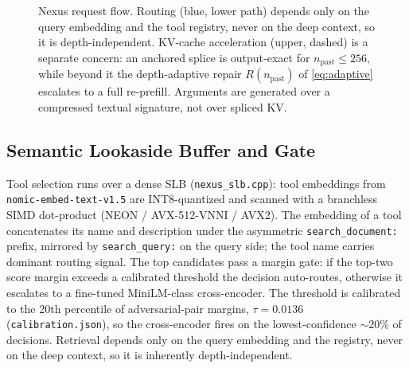 \documentclass[10pt,conference]{IEEEtran}
\newcommand{\code}[1]{\texttt{\small #1}}
\begin{document}
\begin{figure}[t]
\caption{Nexus request flow. Routing (blue, lower path) depends only on the query embedding and
the tool registry, never on the deep context, so it is depth-independent. KV-cache acceleration
(upper, dashed) is a separate concern: an anchored splice is output-exact for
$n_{\mathrm{past}}\le 256$, while beyond it the depth-adaptive repair $R(n_{\mathrm{past}})$ of
\eqref{eq:adaptive} escalates to a full re-prefill. Arguments are generated over a compressed
textual signature, not over spliced KV.}
\label{fig:arch}
\end{figure}

\subsection{Semantic Lookaside Buffer and Gate}
Tool selection runs over a dense SLB (\code{nexus\_slb.cpp}): tool embeddings from
\code{nomic-embed-text-v1.5} are INT8-quantized and scanned with a branchless SIMD dot-product
(NEON / AVX-512-VNNI / AVX2). The embedding of a tool concatenates its name and description
under the asymmetric \code{search\_document:} prefix, mirrored by \code{search\_query:} on the
query side; the tool name carries dominant routing signal. The top candidates pass a margin gate:
if the top-two score margin exceeds a calibrated threshold the decision auto-routes, otherwise it
escalates to a fine-tuned MiniLM-class cross-encoder. The threshold is calibrated to the 20th
percentile of adversarial-pair margins, $\tau=0.0136$ (\code{calibration.json}), so the
cross-encoder fires on the lowest-confidence ${\sim}20\%$ of decisions. Retrieval depends only on
the query embedding and the registry, never on the deep context, so it is inherently
depth-independent.
\end{document}
